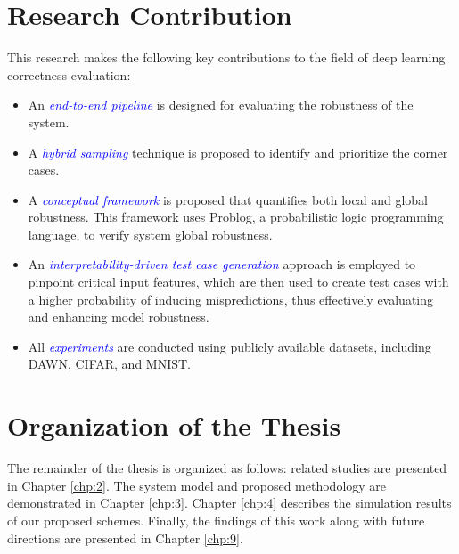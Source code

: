 \section{Research Contribution}

This research makes the following key contributions to the field of deep learning correctness evaluation:

\begin{itemize}
    \item An \textit{\textcolor{blue}{end-to-end pipeline}} is designed for evaluating the robustness of the system.
    \item A \textit{\textcolor{blue}{hybrid sampling}} technique is proposed to identify and prioritize the corner cases.
    \item A \textit{\textcolor{blue}{conceptual framework}} is proposed that quantifies both local and global robustness. This framework uses Problog, a probabilistic logic programming language, to verify system global robustness. 
    \item An \textit{\textcolor{blue}{interpretability-driven test case generation}} approach is employed to pinpoint critical input features, which are then used to create test cases with a higher probability of inducing mispredictions, thus effectively evaluating and enhancing model robustness.
    \item All \textit{\textcolor{blue}{experiments}} are conducted using publicly available datasets, including DAWN, CIFAR, and MNIST.
\end{itemize}

\begin{center}
    \end{center}
\section{Organization of the Thesis}\hypertarget{organization of thesis}{}
The remainder of the thesis is organized as follows: related studies are presented in Chapter \ref{chp:2}. The system model and proposed methodology are demonstrated in Chapter \ref{chp:3}. Chapter \ref{chp:4} describes the simulation results of our proposed schemes. Finally, the findings of this work along with future directions are presented in Chapter \ref{chp:9}.




\clearpage
